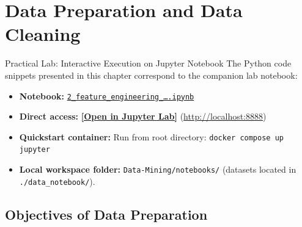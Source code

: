 \chapter{Data Preparation and Data Cleaning}
\label{ch:data-preparation}

\begin{noteblock}{Practical Lab: Interactive Execution on Jupyter Notebook}
The Python code snippets presented in this chapter correspond to the companion lab notebook:
\begin{itemize}
    \item \textbf{Notebook:} \href{http://localhost:8888/lab/tree/notebooks/2_feature_engineering_and_data_representation.ipynb}{\texttt{2\_feature\_engineering\_\dots.ipynb}}
    \item \textbf{Direct access:} \href{http://localhost:8888/lab/tree/notebooks/2_feature_engineering_and_data_representation.ipynb}{\textbf{[Open in Jupyter Lab]}} \quad (\url{http://localhost:8888})
    \item \textbf{Quickstart container:} Run from root directory: \texttt{docker compose up jupyter}
    \item \textbf{Local workspace folder:} \texttt{Data-Mining/notebooks/} (datasets located in \texttt{./data\_notebook/}).
\end{itemize}
\end{noteblock}

\FloatBarrier
\section{Objectives of Data Preparation}

